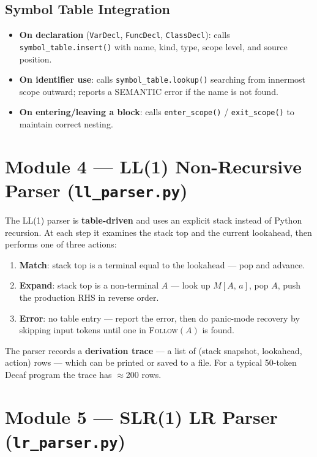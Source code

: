 \documentclass[12pt,a4paper]{article}
\begin{document}
\subsection*{Symbol Table Integration}
\begin{itemize}
  \item \textbf{On declaration} (\texttt{VarDecl}, \texttt{FuncDecl},
    \texttt{ClassDecl}): calls \texttt{symbol\_table.insert()} with name, kind,
    type, scope level, and source position.
  \item \textbf{On identifier use}: calls \texttt{symbol\_table.lookup()} searching
    from innermost scope outward; reports a SEMANTIC error if the name is not found.
  \item \textbf{On entering/leaving a block}: calls \texttt{enter\_scope()} /
    \texttt{exit\_scope()} to maintain correct nesting.
\end{itemize}

\section{Module 4 — LL(1) Non-Recursive Parser (\texttt{ll\_parser.py})}

The LL(1) parser is \textbf{table-driven} and uses an explicit stack instead of
Python recursion. At each step it examines the stack top and the current lookahead,
then performs one of three actions:

\begin{enumerate}
  \item \textbf{Match}: stack top is a terminal equal to the lookahead — pop and
    advance.
  \item \textbf{Expand}: stack top is a non-terminal $A$ — look up $M[A,\,a]$, pop
    $A$, push the production RHS in reverse order.
  \item \textbf{Error}: no table entry — report the error, then do panic-mode
    recovery by skipping input tokens until one in \textsc{Follow}$(A)$ is found.
\end{enumerate}

The parser records a \textbf{derivation trace} — a list of
(stack snapshot, lookahead, action) rows — which can be printed or saved to a file.
For a typical 50-token Decaf program the trace has $\approx$200 rows.

\section{Module 5 — SLR(1) LR Parser (\texttt{lr\_parser.py})}
\end{document}
